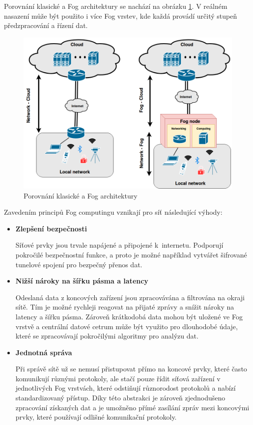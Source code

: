  Porovnání klasické a Fog architektury se nachází na obrázku \ref{obr.fog}. V reálném nasazení může
 být použito i více Fog vrstev, kde každá provádí určitý stupeň předzpracování a řízení
 dat.
\begin{figure}[ht]
\begin{center}
\includegraphics[scale=0.38]{pictures/fog}
\caption{Porovnání klasické a Fog architektury}
\label{obr.fog}
\end{center}
\end{figure}
 Zavedením principů Fog computingu vznikají pro síť následující výhody:
 \begin{itemize}
 \item \textbf{Zlepšení bezpečnosti} \cite{fog}
 
     Síťové prvky jsou trvale napájené a připojené k internetu. Podporují pokročilé
     bezpečnostní funkce, a proto je možné například vytvářet šifrované tunelové
     spojení pro bezpečný přenos dat.     
\item \textbf{Nižší nároky na šířku pásma a latency} \cite{fog}

    Odeslaná data z koncových zařízení jsou zpracovávána a filtrována na okraji 
    sítě. Tím je možné rychleji reagovat na přijaté zprávy a snížit nároky
    na latency a šířku pásma. Zároveň krátkodobá data mohou být uložené ve 
    Fog vrstvě a centrální datové cetrum může být využito pro dlouhodobé údaje, 
    které se zpracovávají pokročilými algoritmy pro analýzu dat.
 \item \textbf{Jednotná správa} \cite{fog}
 
    Při správě sítě už se nemusí přistupovat přímo na koncové prvky, které 
    často komunikují různými protokoly, ale stačí pouze
    řídit síťová zařízení v jednotlivých Fog vrstvách, které odstiňují různorodost
    protokolů a nabízí standardizovaný přístup. Díky této abstrakci je 
    zároveň zjednodušeno zpracování získaných dat a je umožněno přímé zasílání zpráv
    mezi koncovými prvky, které používají odlišné komunikační protokoly.
 \end{itemize} 
 

